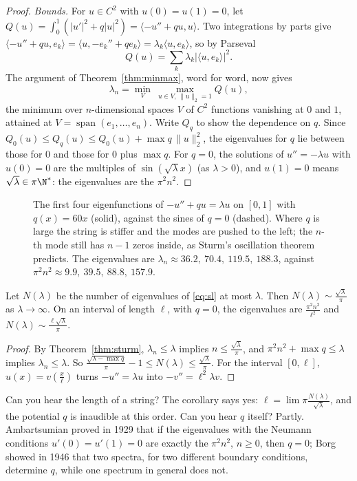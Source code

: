 \begin{proof}
\emph{Bounds.} For $u\in C^2$ with $u(0)=u(1)=0$, let $Q(u)=\int_0^1(|u'|^2+q|u|^2)=\langle-u''+qu,u\rangle$. Two integrations by parts give $\langle-u''+qu,e_k\rangle=\langle u,-e_k''+qe_k\rangle=\lambda_k\langle u,e_k\rangle$, so by Parseval
\[Q(u)=\sum_k\lambda_k|\langle u,e_k\rangle|^2.\]
The argument of Theorem~\ref{thm:minmax}, word for word, now gives
\[\lambda_n=\min_V\ \max_{u\in V,\,\|u\|_2=1}Q(u),\]
the minimum over $n$-dimensional spaces $V$ of $C^2$ functions vanishing at $0$ and $1$, attained at $V=\operatorname{span}(e_1,\dots,e_n)$. Write $Q_q$ to show the dependence on $q$. Since $Q_0(u)\le Q_q(u)\le Q_0(u)+\max q\,\|u\|_2^2$,
the eigenvalues for $q$ lie between those for $0$ and those for $0$ plus $\max q$. For $q=0$, the solutions of $u''=-\lambda u$ with $u(0)=0$ are the multiples of $\sin(\sqrt\lambda x)$ (as $\lambda>0$), and $u(1)=0$ means
$\sqrt\lambda\in\pi\N^*$: the eigenvalues are the $\pi^2n^2$.
\end{proof}

\begin{figure}[ht]
\centering
{}
\caption{The first four eigenfunctions of $-u''+qu=\lambda u$ on $[0,1]$ with $q(x)=60x$ (solid), against the sines of $q=0$ (dashed). Where $q$ is large the string is stiffer and the modes are
pushed to the left; the $n$-th mode still has $n-1$ zeros inside, as Sturm's oscillation theorem predicts. The eigenvalues are $\lambda_n\approx36.2,\ 70.4,\ 119.5,\ 188.3$, against $\pi^2n^2\approx9.9,\ 39.5,\ 88.8,\ 157.9$.}
\label{fig:sturm}
\end{figure}

\begin{corollary}\label{cor:weyllaw}
Let $N(\lambda)$ be the number of eigenvalues of \eqref{eq:sl} at most $\lambda$. Then $N(\lambda)\sim\frac{\sqrt\lambda}\pi$ as $\lambda\to\infty$. On an interval of length $\ell$, with $q=0$, the eigenvalues are $\frac{\pi^2n^2}{\ell^2}$
and $N(\lambda)\sim\frac{\ell\sqrt\lambda}\pi$.
\end{corollary}
\begin{proof}
By Theorem~\ref{thm:sturm}, $\lambda_n\le\lambda$ implies $n\le\frac{\sqrt\lambda}\pi$, and $\pi^2n^2+\max q\le\lambda$ implies $\lambda_n\le\lambda$. So $\frac{\sqrt{\lambda-\max q}}\pi-1\le N(\lambda)\le\frac{\sqrt\lambda}\pi$. For the
interval $[0,\ell]$, $u(x)=v(\frac x\ell)$ turns $-u''=\lambda u$ into $-v''=\ell^2\lambda v$.
\end{proof}

\begin{think}
Can you hear the length of a string? The corollary says yes: $\ell=\lim\pi\frac{N(\lambda)}{\sqrt\lambda}$, and the potential $q$ is inaudible at this order. Can you hear $q$ itself? Partly. Ambartsumian proved in 1929 that if the
eigenvalues with the Neumann conditions $u'(0)=u'(1)=0$ are exactly the $\pi^2n^2$, $n\ge0$, then $q=0$; Borg showed in 1946 that two spectra, for two different boundary conditions, determine $q$, while one spectrum in general does not.
\end{think}

